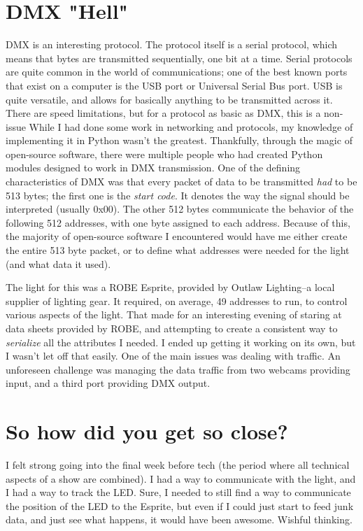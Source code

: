 \documentclass[
    12pt,
    twoside,
    bibstyle=chicago,
    headerstyle=uppercase,
	bibfile=biblatex_updating.bib
]{reedthesis}
\begin{document}
\section{DMX "Hell"}
DMX is an interesting protocol. The protocol itself is a serial protocol, which means that bytes are transmitted sequentially, one bit at a time. Serial protocols are quite common in the world of communications; one of the best known ports that exist on a computer is the USB port or Universal Serial Bus port. USB is quite versatile, and allows for basically anything to be transmitted across it. There are speed limitations, but for a protocol as basic as DMX, this is a non-issue While I had done some work in networking and protocols, my knowledge of implementing it in Python wasn't the greatest. Thankfully, through the magic of open-source software, there were multiple people who had created Python modules designed to work in DMX transmission. One of the defining characteristics of DMX was that every packet of data to be transmitted \textit{had} to be 513 bytes; the first one is the \textit{start code}. It denotes the way the signal should be interpreted (usually 0x00). The other 512 bytes communicate the behavior of the following 512 addresses, with one byte assigned to each address. Because of this, the majority of open-source software I encountered would have me either create the entire 513 byte packet, or to define what addresses were needed for the light (and what data it used).

The light for this was a ROBE Esprite, provided by Outlaw Lighting--a local supplier of lighting gear. It required, on average, 49 addresses to run, to control various aspects of the light. That made for an interesting evening of staring at data sheets provided by ROBE, and attempting to create a consistent way to \textit{serialize} all the attributes I needed. I ended up getting it working on its own, but I wasn't let off that easily. One of the main issues was dealing with traffic. An unforeseen challenge was managing the data traffic from two webcams providing input, and a third port providing DMX output.

\section{So how did you get so close?}

I felt strong going into the final week before tech (the period where all technical aspects of a show are combined). I had a way to communicate with the light, and I had a way to track the LED. Sure, I needed to still find a way to communicate the position of the LED to the Esprite, but even if I could just start to feed junk data, and just see what happens, it would have been awesome. Wishful thinking.
\end{document}
